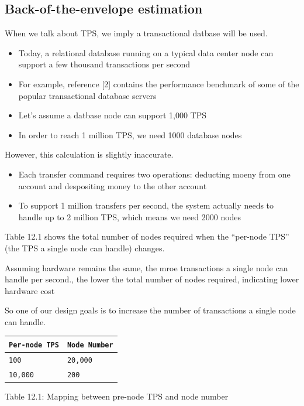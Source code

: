 \documentclass{report}
\theoremstyle{definition}
\let\oldsubsection\subsection
\renewcommand{\subsection}{\oldsubsection*}
\begin{document}
\subsection{Back-of-the-envelope estimation}

When we talk about TPS, we imply a transactional datbase will be used.

\begin{itemize}
\item
Today, a relational database running on a typical data center node can support a few thousand transactions per second
\item
For example, reference [2] contains the performance benchmark of some of the popular transactional database servers
\item
Let's assume a datbase node can support 1,000 TPS
\item
In order to reach 1 million TPS, we need 1000 database nodes
\end{itemize}

However, this calculation is slightly inaccurate.

\begin{itemize}
\item
Each transfer command requires two operations: deducting moeny from one account and despositing money to the other account
\item
To support 1 million transfers per second, the system actually needs to handle up to 2 million TPS, which means we need 2000 nodes
\end{itemize}

Table 12.1 shows the total number of nodes required when the ``per-node TPS'' (the TPS a single node can handle) changes.

Assuming hardware remains the same, the mroe transactions a single node can handle per second., the lower the total number of nodes required, indicating lower hardware cost

So one of our design goals is to increase the number of transactions a single node can handle.

\begin{tabular}{|p{6cm}|p{6cm}|}
\hline
\lstinline|Per-node TPS| & \lstinline|Node Number| \\
\hline
\lstinline|100| & \lstinline|20,000| \\
\hline
\lstinline|10,000| & \lstinline|200| \\
\hline
\end{tabular}

Table 12.1: Mapping between pre-node TPS and node number
\end{document}
